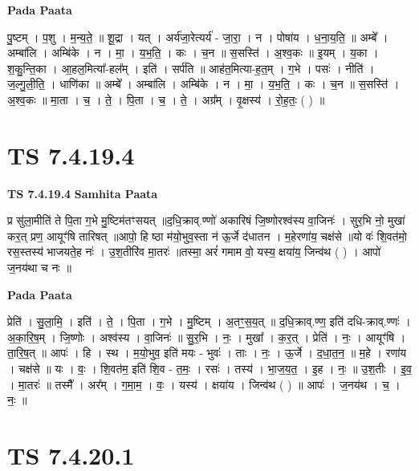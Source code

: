 \documentclass[17pt]{extarticle}
\begin{document}
\textbf{Pada Paata} \newline

पु॒ष्टम् । प॒शु । म॒न्य॒ते॒ ॥ शू॒द्रा । यत् । अर्य॑जा॒रेत्यर्य॑ - जा॒रा॒ । न । पोषा॑य । ध॒ना॒य॒ति॒ ॥ अम्बे᳚ । अम्बा॑लि । अम्बि॑के । न । मा॒ । य॒भ॒ति॒ । कः । च॒न ॥ स॒सस्ति॑ । अ॒श्व॒कः ॥ इ॒यम् । य॒का । श॒कु॒न्ति॒का । आ॒हल॒मित्या᳚-हल᳚म् । इति॑ । सर्प॑ति ॥ आह॑त॒मित्या-ह॒त॒म् । ग॒भे । पसः॑ । नीति॑ । ज॒ल्गु॒ली॒ति॒ । धाणि॑का ॥ अम्बे᳚ । अम्बा॑लि । अम्बि॑के । न । मा॒ । य॒भ॒ति॒ । कः । च॒न ॥ स॒सस्ति॑ । अ॒श्व॒कः ॥ मा॒ता । च॒ । ते॒ । पि॒ता । च॒ । ते॒ । अग्र᳚म् । वृ॒क्षस्य॑ । रो॒ह॒तः॒ ( ) ॥  \newline




\section*{ TS 7.4.19.4 }

\textbf{TS 7.4.19.4 } \newline
\textbf{Samhita Paata} \newline

प्र सु॑ला॒मीति॑ ते पि॒ता ग॒भे मु॒ष्टिम॑तꣳसयत् ॥द॒धि॒क्राव्.ण्णो॑ अकारिषं जि॒ष्णोरश्व॑स्य वा॒जिनः॑ । सुर॒भि नो॒ मुखा॑ कर॒त् प्रण॒ आयूꣳ॑षि तारिषत् ॥आपो॒ हि ष्ठा म॑यो॒भुव॒स्ता न॑ ऊ॒र्जे द॑धातन । म॒हेरणा॑य॒ चक्ष॑से ॥यो वः॑ शि॒वत॑मो॒ रस॒स्तस्य॑ भाजयते॒ह नः॑ । उ॒श॒तीरि॑व मा॒तरः॑ ॥तस्मा॒ अरं॑ गमाम वो॒ यस्य॒ क्षया॑य॒ जिन्व॑थ ( ) । आपो॑ ज॒नय॑था च नः ॥ \newline

\textbf{Pada Paata} \newline

प्रेति॑ । सु॒ला॒मि॒ । इति॑ । ते॒ । पि॒ता । ग॒भे । मु॒ष्टिम् । अ॒तꣳ॒॒स॒य॒त् ॥ द॒धि॒क्राव्.ण्ण॒ इति॑ दधि-क्राव्.ण्णः॑ । अ॒का॒रि॒ष॒म् । जि॒ष्णोः । अश्व॑स्य । वा॒जिनः॑ ॥ सु॒र॒भि । नः॒ । मुखा᳚ । क॒र॒त् । प्रेति॑ । नः॒ । आयूꣳ॑षि । ता॒रि॒ष॒त् ॥ आपः॑ । हि । स्थ । म॒यो॒भुव॒ इति॑ मयः - भुवः॑ । ताः । नः॒ । ऊ॒र्जे । द॒धा॒त॒न॒ ॥ म॒हे । रणा॑य । चक्ष॑से ॥ यः । वः॒ । शि॒वत॑म॒ इति॑ शि॒व - त॒मः॒ । रसः॑ । तस्य॑ । भा॒ज॒य॒त॒ । इ॒ह । नः॒ ॥ उ॒श॒तीः । इ॒व॒ । मा॒तरः॑ ॥ तस्मै᳚ । अर᳚म् । ग॒मा॒म॒ । वः॒ । यस्य॑ । क्षया॑य । जिन्व॑थ ( ) ॥ आपः॑ । ज॒नय॑थ । च॒ । नः॒ ॥  \newline




\section*{ TS 7.4.20.1 }
\end{document}
